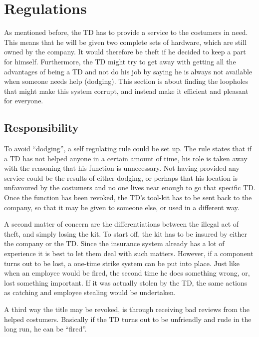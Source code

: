 \documentclass[final]{report} %
\begin{document}

\section{Regulations}\label{sec:regulations}
As mentioned before, the TD has to provide a service to the costumers in need. This means that he will be given two complete sets of hardware, which are still owned by the company. It would therefore be theft if he decided to keep a part for himself. Furthermore, the TD might try to get away with getting all the advantages of being a TD and not do his job by saying he is always not available when someone needs help (dodging). This section is about finding the loopholes that might make this system corrupt, and instead make it efficient and pleasant for everyone.

\subsection{Responsibility}
To avoid ``dodging'', a self regulating rule could be set up. The rule states that if a TD has not helped anyone in a certain amount of time, his role is taken away with the reasoning that his function is unnecessary. Not having provided any service could be the results of either dodging, or perhaps that his location is unfavoured by the costumers and no one lives near enough to go that specific TD. Once the function has been revoked, the TD's tool-kit has to be sent back to the company, so that it may be given to someone else, or used in a different way.

A second matter of concern are the differentiations between the illegal act of theft, and simply losing the kit. To start off, the kit has to be insured by either the company or the TD. Since the insurance system already has a lot of experience it is best to let them deal with such matters. However, if a component turns out to be lost, a one-time strike system can be put into place. Just like when an employee would be fired, the second time he does something wrong, or, lost something important. If it was actually stolen by the TD, the same actions as catching and employee stealing would be undertaken. 

A third way the title may be revoked, is through receiving bad reviews from the helped costumers. Basically if the TD turns out to be unfriendly and rude in the long run, he can be ``fired''.
\end{document}
